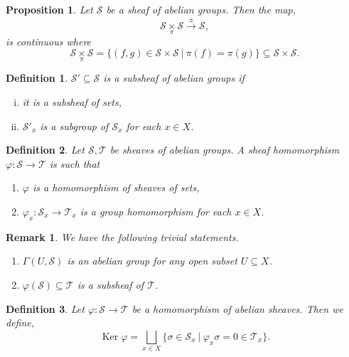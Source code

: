 \documentclass{article}
\newtheorem{proposition}{Proposition}[section]
\newtheorem{definition}{Definition}[section]
\newtheorem{remark}{Remark}[section]
\DeclareMathOperator{\Ker}{Ker}
\newcommand{\sep}[0]{\:|\:}
\newcommand{\fib}[1]{%
  \mathbin{\mathop{\times}\limits_{#1}}%
}
\begin{document}
\begin{proposition}
  Let $\mathcal{S}$ be a sheaf of abelian groups. Then the map,
  \begin{equation*}
    \mathcal{S}\fib{\pi}\mathcal{S} \stackrel{\pm}{\to}\mathcal{S},
  \end{equation*}
  is continuous where 
  \begin{equation*}
    \mathcal{S}\fib{\pi}\mathcal{S} = \{(f,g)\in \mathcal{S}\times\mathcal{S}\sep \pi(f) = \pi(g)\}\subseteq\mathcal{S}\times\mathcal{S}.
  \end{equation*}
\end{proposition}

\begin{definition}
  $\mathcal{S}'\subseteq\mathcal{S}$ is a subsheaf of abelian groups if 
  \begin{enumerate}[i).]
    \item it is a subsheaf of sets,
    \item $\mathcal{S}'_x$ is a subgroup of $\mathcal{S}_x$ for each $x\in X$.
  \end{enumerate}
\end{definition}

\begin{definition}
  Let $\mathcal{S},\mathcal{T}$ be sheaves of abelian groups. A sheaf homomorphism $\varphi:\mathcal{S}\to\mathcal{T}$ is such that 
  \begin{enumerate}
    \item $\varphi$ is a homomorphism of sheaves of sets,
    \item $\varphi_x:\mathcal{S}_x\to\mathcal{T}_x$ is a group homomorphism for each $x\in X$.
  \end{enumerate}
\end{definition}

\begin{remark}
  We have the following trivial statements.
  \begin{enumerate}[1).]
    \item $\Gamma(U,\mathcal{S})$ is an abelian group for any open subset $U\subseteq X$.
    \item $\varphi(\mathcal{S})\subseteq\mathcal{T}$ is a subsheaf of $\mathcal{T}$.
  \end{enumerate}
\end{remark}

\begin{definition}
  Let $\varphi:\mathcal{S}\to\mathcal{T}$ be a homomorphism of abelian sheaves. Then we define,
  \begin{equation*}
    \Ker\varphi = \bigsqcup_{x\in X}\{\sigma\in\mathcal{S}_x\sep \varphi_x\sigma = 0\in\mathcal{T}_x\}.
  \end{equation*}
\end{definition}
\end{document}
